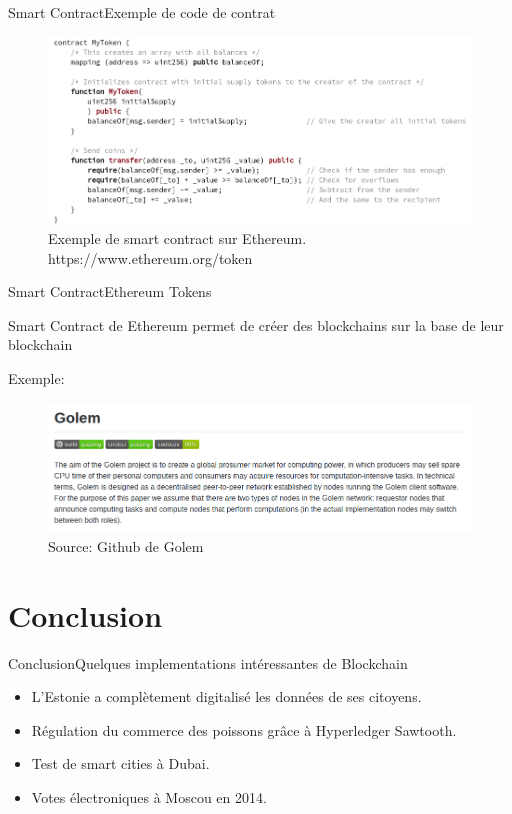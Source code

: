 \documentclass[xcolor=dvipsnames]{beamer}
\begin{document}
\begin{frame}{Smart Contract}{Exemple de code de contrat}

	\begin{figure}
		\centering
		\includegraphics[scale=.35]{contract_example}
		\caption{Exemple de smart contract sur Ethereum. https://www.ethereum.org/token}
	\end{figure}

\end{frame}

\begin{frame}{Smart Contract}{Ethereum Tokens}

	\begin{center}
		\color{blue}
		Smart Contract de Ethereum permet de créer des blockchains sur la base de leur blockchain
	\end{center}
	
	Exemple:
	\begin{figure}
	\includegraphics[scale=.35]{golem}
	\caption{Source: Github de Golem}
	\end{figure}

\end{frame}

\section{Conclusion}

\begin{frame}{Conclusion}{Quelques implementations intéressantes de Blockchain}

	\begin{itemize}
		\item L'Estonie a complètement digitalisé les données de ses citoyens.
		\item Régulation du commerce des poissons grâce à Hyperledger Sawtooth.
		\item Test de smart cities à Dubai.
		\item Votes électroniques à Moscou en 2014.
	\end{itemize}
	
\end{frame}
\end{document}
